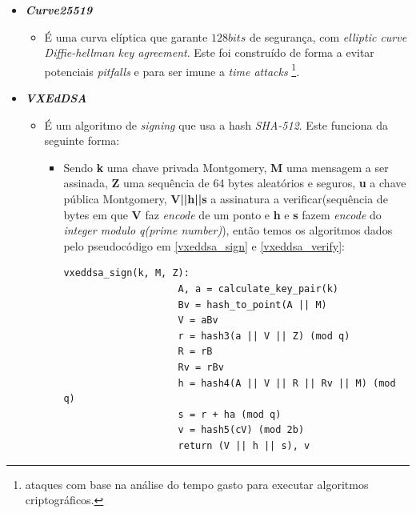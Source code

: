 \begin{itemize}
    \item \textit{\textbf{Curve25519}}
    \begin{itemize}
        \item É uma curva elíptica que garante $128 bits$ de segurança, com \textit{elliptic curve Diffie-hellman key agreement}. Este foi construído de forma a evitar potenciais \textit{pitfalls} e para ser imune a \textit{time attacks} \footnote{ataques com base na análise do tempo gasto para executar algoritmos criptográficos.}.
    \end{itemize}

    \item \textit{\textbf{VXEdDSA}}
    \begin{itemize}
        \item É um algoritmo de \textit{signing} que usa a hash \textit{SHA-512}. Este funciona da seguinte forma:
        \begin{itemize}
            \item Sendo \textbf{k} uma chave privada Montgomery, \textbf{M} uma mensagem a ser assinada, \textbf{Z} uma sequência de 64 bytes aleatórios e seguros, \textbf{u} a chave pública Montgomery, \textbf{V||h||s} a assinatura a verificar(sequência de bytes em que \textbf{V} faz \textit{encode} de um ponto e \textbf{h} e \textbf{s} fazem \textit{encode} do \textit{integer modulo q(prime number)}), então temos os algoritmos dados pelo pseudocódigo em \ref{vxeddsa_sign} e \ref{vxeddsa_verify}:
            
            \begin{lstlisting}[caption=Assinatura de um documento,captionpos=b, label={vxeddsa_sign}]
                vxeddsa_sign(k, M, Z):
                    A, a = calculate_key_pair(k)
                    Bv = hash_to_point(A || M)
                    V = aBv
                    r = hash3(a || V || Z) (mod q)
                    R = rB
                    Rv = rBv
                    h = hash4(A || V || R || Rv || M) (mod q)
                    s = r + ha (mod q)
                    v = hash5(cV) (mod 2b)
                    return (V || h || s), v
                \end{lstlisting}
            

\end{itemize}
\end{itemize}
\end{itemize}
